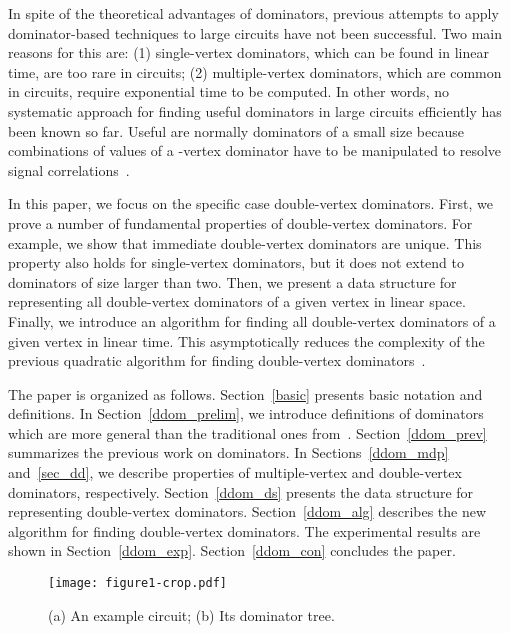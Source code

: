 \documentclass{llncs}
\begin{document}
In spite of the theoretical advantages of dominators,
previous attempts to apply dominator-based techniques to large circuits
have not been successful. 
Two main reasons for this are: (1) single-vertex dominators,
which can be found in linear time, are too rare in circuits; (2)
multiple-vertex dominators, which are common in circuits, require
exponential time to be computed. 
In other words, no systematic approach
for finding useful dominators in large circuits efficiently has been known so far.
Useful are normally dominators of a
small size because  combinations of values
of a -vertex dominator have to be manipulated to resolve signal correlations~\cite{KrDK03}.

In this paper, we focus on the specific case double-vertex dominators.  
First, we prove a number of fundamental properties of double-vertex dominators.
For example, we show that immediate double-vertex dominators are unique.
This property also holds for single-vertex dominators, but it does not extend
to dominators of size larger than two. Then, we present a data structure for representing
all double-vertex dominators of a given vertex in linear space. 
Finally, we introduce an algorithm for finding
all double-vertex dominators of a given vertex in linear time.
This asymptotically reduces the complexity of the previous quadratic
algorithm for finding double-vertex dominators~\cite{TeD05b}.




The paper is organized as follows. Section~\ref{basic} 
presents basic notation and definitions.
In Section~\ref{ddom_prelim}, we introduce
definitions of dominators which are more
general than the traditional ones from~\cite{LeT79}. 
Section~\ref{ddom_prev} summarizes the
previous work on dominators.  
In Sections~\ref{ddom_mdp} and~\ref{sec_dd}, we describe properties of 
multiple-vertex and double-vertex dominators, respectively.
Section~\ref{ddom_ds} presents the data
structure for representing double-vertex dominators.
Section~\ref{ddom_alg} describes the new algorithm for finding double-vertex dominators. 
The experimental results are shown in
Section~\ref{ddom_exp}. Section~\ref{ddom_con} concludes the paper.

\begin{figure}[t!]
\begin{center}
\texttt{[image: figure1-crop.pdf]}
\caption{(a) An example circuit; (b) Its dominator tree.}
\label{ddom_f2}
\end{center}
\end{figure}
\end{document}
